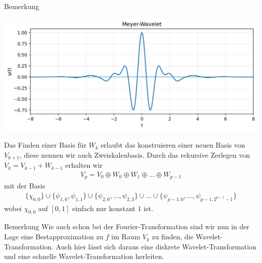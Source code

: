 \begin{colbox}{Bemerkung}
\begin{minipage}[t]{.49\textwidth}
    \includegraphics[width=\linewidth]{figures/meyer_wavelet.png}
  \end{minipage}
\end{colbox}

Das Finden einer Basis für $W_{k}$ erlaubt das konstruieren einer neuen Basis von $V_{k+1}$, diese nennen wir 
auch Zweiskalenbasis. Durch das rekursive Zerlegen von $V_k=V_{k-1}+W_{k-1}$ erhalten wir 
%
\begin{align*}
  V_p = V_0 \oplus W_0 \oplus W_1 \oplus \dots \oplus W_{p-1}
\end{align*}
%
mit der Basis 
%
\begin{align*}
  \{\chi_{0,0}\}
  \cup \{\psi_{1,0}, \psi_{1,1}\}
  \cup \{\psi_{2,0},\dots,\psi_{2,3}\} 
  \cup \dots \cup\{\psi_{p-1,0}, \dots, \psi_{p-1,2^{p-1}-1}\}
\end{align*}
%
wobei $\chi_{0,0}$ auf $[0,1]$ einfach nur konstant $1$ ist.

\begin{colbox}{Bemerkung}
  Wie auch schon bei der Fourier-Transformation sind wir nun in der Lage eine Bestapproximation zu $f$ im Raum $V_k$ 
  zu finden, die Wavelet-Transformation. Auch hier lässt sich daraus eine diskrete Wavelet-Transformation und eine 
  schnelle Wavelet-Transformation herleiten. 
\end{colbox}